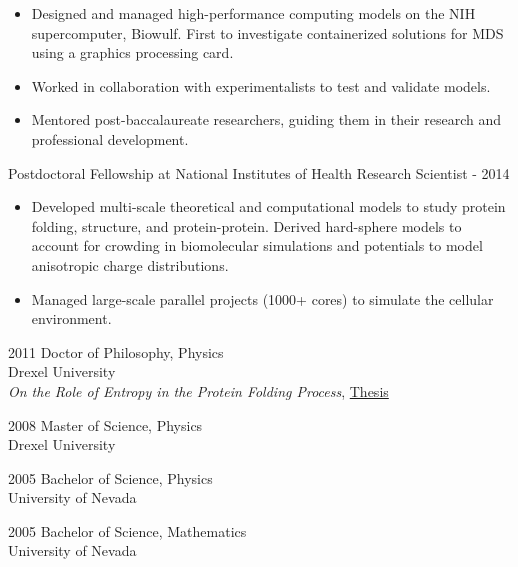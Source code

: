 \documentclass[]{scrartcl}
\begin{document}
\begin{cleanCV}
{\begin{itemize}
  \item Designed and managed high-performance computing models on the NIH supercomputer, Biowulf. First to investigate containerized solutions for MDS using a graphics processing card.

  \item Worked in collaboration with experimentalists to test and validate models.
   \item Mentored post-baccalaureate researchers, guiding them in their research and professional development.

  \end{itemize}
}

\newpage

\WorkExperience
{}
{Postdoctoral Fellowship at National Institutes of Health}
{
  \newline Research Scientist
   - 2014
}
{
  \begin{itemize}
  \item Developed multi-scale theoretical and computational models to study protein folding, structure, and protein-protein. Derived hard-sphere models to account for crowding in biomolecular simulations and potentials to model anisotropic charge distributions.
  \item Managed large-scale parallel projects (1000+ cores) to simulate the cellular environment.
  \end{itemize}
}



\WorkExperience
{2011}
{Doctor of Philosophy, Physics}
{
\\Drexel University
\\\emph{On the Role of Entropy in the Protein Folding Process}, \href{https://idea.library.drexel.edu/islandora/object/idea:3488}{Thesis}
}

\WorkExperience
{2008}
{Master of Science, Physics}
{\\Drexel University}

\WorkExperience
{2005}
{Bachelor of Science, Physics}
{\\University of Nevada}

\WorkExperience
{2005}
{Bachelor of Science, Mathematics}
{\\University of Nevada}



\end{cleanCV}
\end{document}
